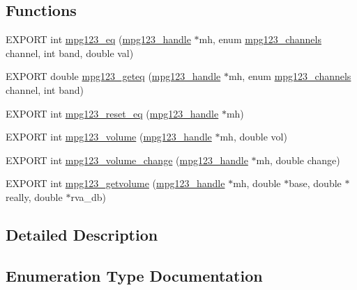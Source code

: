 \subsection*{Functions}
\begin{DoxyCompactItemize}
\item 
E\+X\+P\+O\+RT int \hyperlink{group__mpg123__voleq_ga9f4b1d0684de725162ae2daa20084397}{mpg123\+\_\+eq} (\hyperlink{group__mpg123__init_ga6728e2839a395f3a07d4514da659faca}{mpg123\+\_\+handle} $\ast$mh, enum \hyperlink{group__mpg123__voleq_gaf6ae0d8c593d295c36e7d20e9f892840}{mpg123\+\_\+channels} channel, int band, double val)
\item 
E\+X\+P\+O\+RT double \hyperlink{group__mpg123__voleq_gaaed80df5bab4d9396680ab13fff10903}{mpg123\+\_\+geteq} (\hyperlink{group__mpg123__init_ga6728e2839a395f3a07d4514da659faca}{mpg123\+\_\+handle} $\ast$mh, enum \hyperlink{group__mpg123__voleq_gaf6ae0d8c593d295c36e7d20e9f892840}{mpg123\+\_\+channels} channel, int band)
\item 
E\+X\+P\+O\+RT int \hyperlink{group__mpg123__voleq_gaef321456fd43bbe9d52a5f507cc83d9b}{mpg123\+\_\+reset\+\_\+eq} (\hyperlink{group__mpg123__init_ga6728e2839a395f3a07d4514da659faca}{mpg123\+\_\+handle} $\ast$mh)
\item 
E\+X\+P\+O\+RT int \hyperlink{group__mpg123__voleq_ga16fcff6db0bffbbc4341c07e373d3bd7}{mpg123\+\_\+volume} (\hyperlink{group__mpg123__init_ga6728e2839a395f3a07d4514da659faca}{mpg123\+\_\+handle} $\ast$mh, double vol)
\item 
E\+X\+P\+O\+RT int \hyperlink{group__mpg123__voleq_gaae358b14b2f7f2d66af48b484a0de1db}{mpg123\+\_\+volume\+\_\+change} (\hyperlink{group__mpg123__init_ga6728e2839a395f3a07d4514da659faca}{mpg123\+\_\+handle} $\ast$mh, double change)
\item 
E\+X\+P\+O\+RT int \hyperlink{group__mpg123__voleq_ga9e64133e633dae55d94923a2852e1668}{mpg123\+\_\+getvolume} (\hyperlink{group__mpg123__init_ga6728e2839a395f3a07d4514da659faca}{mpg123\+\_\+handle} $\ast$mh, double $\ast$base, double $\ast$really, double $\ast$rva\+\_\+db)
\end{DoxyCompactItemize}


\subsection{Detailed Description}


\subsection{Enumeration Type Documentation}
\mbox{\label{group__mpg123__voleq_gaf6ae0d8c593d295c36e7d20e9f892840}} 
